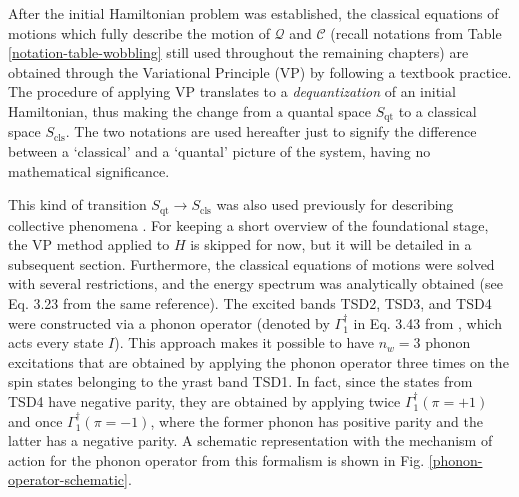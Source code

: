 After the initial Hamiltonian problem was established, the classical equations of motions which fully describe the motion of $\mathcal{Q}$ and $\mathscr{C}$ (recall notations from Table \ref{notation-table-wobbling} still used throughout the remaining chapters) are obtained through the Variational Principle (VP) by following a textbook practice. The procedure of applying VP translates to a \emph{dequantization} of an initial Hamiltonian, thus making the change from a quantal space $S_\text{qt}$ to a classical space $S_\text{cls}$. The two notations are used hereafter just to signify the difference between a `classical' and a `quantal' picture of the system, having no mathematical significance. 

This kind of transition $S_\text{qt}\to S_\text{cls}$ was also used previously for describing collective phenomena \cite{raduta2007semiclassical,chen2016two,budaca2018tilted}. For keeping a short overview of the foundational stage, the VP method applied to $H$ is skipped for now, but it will be detailed in a subsequent section. Furthermore, the classical equations of motions were solved with several restrictions, and the energy spectrum was analytically obtained (see Eq. 3.23 from the same reference). The excited bands TSD2, TSD3, and TSD4 were constructed via a phonon operator (denoted by $\Gamma_1^\dagger$ in Eq. 3.43 from \cite{raduta2017semiclassical}, which acts every state $I$). This approach makes it possible to have $n_w=3$ phonon excitations that are obtained by applying the phonon operator three times on the spin states belonging to the yrast band TSD1. In fact, since the states from TSD4 have negative parity, they are obtained by applying twice $\Gamma_1^\dagger(\pi=+1)$ and once $\Gamma_1^\dagger(\pi=-1)$, where the former phonon has positive parity and the latter has a negative parity. A schematic representation with the mechanism of action for the phonon operator from this formalism is shown in Fig. \ref{phonon-operator-schematic}.
